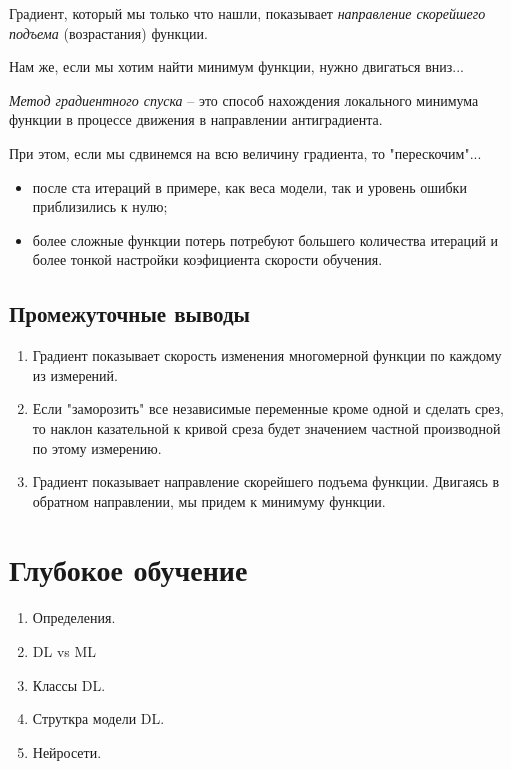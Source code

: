 
Градиент, который мы только что нашли, показывает \emph{направление скорейшего подъема} (возрастания) функции.

Нам же, если мы хотим найти минимум функции, нужно двигаться вниз...

\begin{definition}
  \emph{Метод градиентного спуска} -- это способ нахождения локального минимума функции в процессе движения в направлении антиградиента.
\end{definition}

\begin{note}
  При этом, если мы сдвинемся на всю величину градиента, то "перескочим"...

  \begin{itemize}
    \item после ста итераций в примере, как веса модели, так и уровень ошибки приблизились к нулю;
      \item более сложные функции потерь потребуют большего количества итераций и более тонкой настройки коэфициента скорости обучения.
  \end{itemize}
\end{note}

\subsection{Промежуточные выводы}

\begin{enumerate}
  \item Градиент показывает скорость изменения многомерной функции по каждому из измерений.
    \item Если "заморозить" все независимые переменные кроме одной и сделать срез, то наклон казательной к кривой среза будет значением частной производной по этому измерению.
      \item Градиент показывает направление скорейшего подъема функции. Двигаясь в обратном направлении, мы придем к минимуму функции.
\end{enumerate}

\section{Глубокое обучение}

\begin{enumerate}
  \item Определения.
    \item DL vs ML
      \item Классы DL.
        \item Струткра модели DL.
          \item Нейросети.
\end{enumerate}

